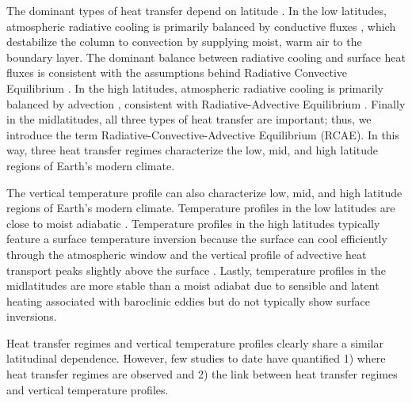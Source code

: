 \documentclass{ametsocV5}
\begin{document}
The dominant types of heat transfer depend on latitude \citep[e.g., see Fig.~6.1 in][]{hartmann2016}. In the low latitudes, atmospheric radiative cooling is primarily balanced by conductive fluxes \citep{riehl1958}, which destabilize the column to convection by supplying moist, warm air to the boundary layer. The dominant balance between radiative cooling and surface heat fluxes is consistent with the assumptions behind Radiative Convective Equilibrium \citep[RCE,][]{wing2018}. In the high latitudes, atmospheric radiative cooling is primarily balanced by advection \citep{nakamura1988}, consistent with Radiative-Advective Equilibrium \citep[RAE,][]{cronin2016}. Finally in the midlatitudes, all three types of heat transfer are important; thus, we introduce the term Radiative-Convective-Advective Equilibrium (RCAE). In this way, three heat transfer regimes characterize the low, mid, and high latitude regions of Earth's modern climate.

The vertical temperature profile can also characterize low, mid, and high latitude regions of Earth's modern climate. Temperature profiles in the low latitudes are close to moist adiabatic \citep{stone1979,betts1982,xu1989,williams1993}. Temperature profiles in the high latitudes typically feature a surface temperature inversion \citep[e.g., see Fig.~1.3 in][]{hartmann2016} because the surface can cool efficiently through the atmospheric window \citep{cronin2016} and the vertical profile of advective heat transport peaks slightly above the surface \citep{oort1974, overland1994, hahn2020, cardinale2021}. Lastly, temperature profiles in the midlatitudes are more stable than a moist adiabat \citep{stone1979,korty2007} due to sensible and latent heating associated with baroclinic eddies but do not typically show surface inversions.

Heat transfer regimes and vertical temperature profiles clearly share a similar latitudinal dependence. However, few studies to date have quantified 1) where heat transfer regimes are observed and 2) the link between heat transfer regimes and vertical temperature profiles.

\end{document}
